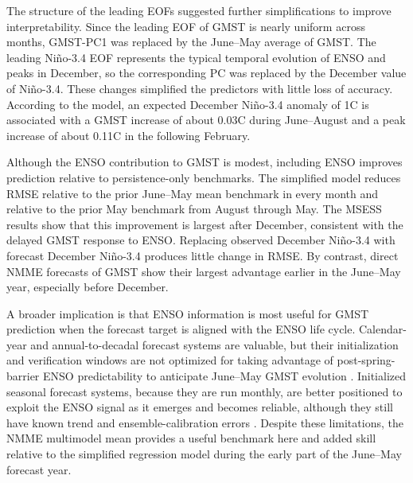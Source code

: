 \documentclass[draft]{agujournal2019}
\begin{document}
The structure of the leading EOFs suggested further simplifications to improve interpretability. Since the leading EOF of GMST is nearly uniform across months, GMST-PC1 was replaced by the June--May average of GMST. The leading Ni\~no-3.4 EOF represents the typical temporal evolution of ENSO and peaks in December, so the corresponding PC was replaced by the December value of Ni\~no-3.4. These changes simplified the predictors with little loss of accuracy. According to the model, an expected December Ni\~no-3.4 anomaly of 1\textdegree C is associated with a GMST increase of about 0.03\textdegree C during June--August and a peak increase of about 0.11\textdegree C in the following February.

Although the ENSO contribution to GMST is modest, including ENSO improves prediction relative to persistence-only benchmarks. The simplified model reduces RMSE relative to the prior June--May mean benchmark in every month and relative to the prior May benchmark from August through May. The MSESS results show that this improvement is largest after December, consistent with the delayed GMST response to ENSO. Replacing observed December Ni\~no-3.4 with forecast December Ni\~no-3.4 produces little change in RMSE. By contrast, direct NMME forecasts of GMST show their largest advantage earlier in the June--May year, especially before December.

A broader implication is that ENSO information is most useful for GMST prediction when the forecast target is aligned with the ENSO life cycle. Calendar-year and annual-to-decadal forecast systems are valuable, but their initialization and verification windows are not optimized for taking advantage of post-spring-barrier ENSO predictability to anticipate June--May GMST evolution \cite{Hermanson2022wmo,WMO2025GADCU, Dunstone2024will,Folland2025review}. Initialized seasonal forecast systems, because they are run monthly, are better positioned to exploit the ENSO signal as it emerges and becomes reliable, although they still have known trend and ensemble-calibration errors \cite{LHeureux2022-Trends1,Mayer2025tropical,Tippett2024trends}. Despite these limitations, the NMME multimodel mean provides a useful benchmark here and added skill relative to the simplified regression model during the early part of the June--May forecast year.

\clearpage

\end{document}
